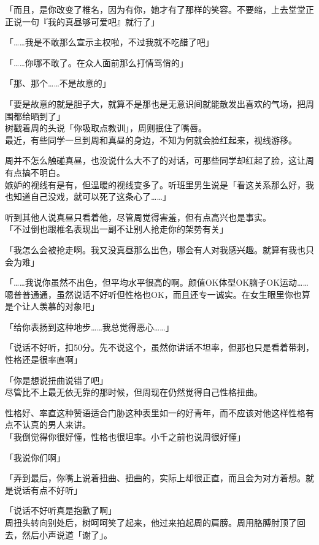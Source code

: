 「而且，是你改变了椎名，因为有你，她才有了那样的笑容。不要缩，上去堂堂正正说一句『我的真昼够可爱吧』就行了」

「……我是不敢那么宣示主权啦，不过我就不吃醋了吧」

「……你哪不敢了。在众人面前那么打情骂俏的」

「那、那个……不是故意的」

「要是故意的就是胆子大，就算不是那也是无意识间就能散发出喜欢的气场，把周围都给晒到了」\\

树戳着周的头说「你吸取点教训」，周则抿住了嘴唇。\\

最近，有些同学一旦到周和真昼的身边，不知为何就会脸红起来，视线游移。

周并不怎么触碰真昼，也没说什么大不了的对话，可那些同学却红起了脸，这让周有点搞不明白。\\

嫉妒的视线有是有，但温暖的视线变多了。听班里男生说是「看这关系那么好，我也知道自己没戏，就可以死了这条心了……」

听到其他人说真昼只看着他，尽管周觉得害羞，但有点高兴也是事实。\\

「不过倒也跟椎名表现出一副不让别人抢走你的架势有关」

「我怎么会被抢走啊。我又没真昼那么出色，哪会有人对我感兴趣。就算有我也只会为难」

「……我说你虽然不出色，但平均水平很高的啊。颜值OK体型OK脑子OK运动……嗯普普通通，虽然说话不好听但性格也OK，而且还专一诚实。在女生眼里你也算是个让人羡慕的对象吧」

「给你表扬到这种地步……我总觉得恶心……」

「说话不好听，扣50分。先不说这个，虽然你讲话不坦率，但那也只是看着带刺，性格还是很率直啊」

「你是想说扭曲说错了吧」\\

尽管比不上最无依无靠的那时候，但周现在仍然觉得自己性格扭曲。

性格好、率直这种赞语适合门胁这种表里如一的好青年，而不应该对他这样性格有点不认真的男人来讲。\\

「我倒觉得你很好懂，性格也很坦率。小千之前也说周很好懂」

「我说你们啊」

「弄到最后，你嘴上说着扭曲、扭曲的，实际上却很正直，而且会为对方着想。就是说话有点不好听」

「说话不好听真是抱歉了啊」\\

周扭头转向别处后，树呵呵笑了起来，他过来拍起周的肩膀。周用胳膊肘顶了回去，然后小声说道「谢了」。
